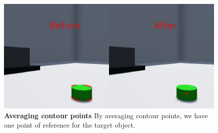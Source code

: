 \begin{figure}[H]
    \centering
    \includegraphics[width=0.9\columnwidth]{figures/src/contour_and_average.png}
    \caption{
	    \textbf{Averaging contour points} By averaging contour points, we have one point of reference for the target object.
    }
    \label{fig:contour_and_average}
\end{figure}

